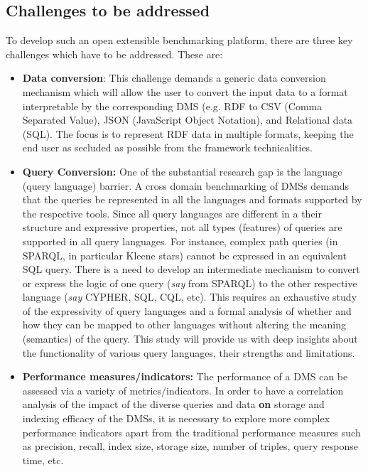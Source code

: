 \documentclass{llncs}
\begin{document}
    \subsection{Challenges to be addressed}\label{challenges}
        To develop such an open extensible benchmarking platform, there are three key challenges which have to be addressed. These are:
        \begin{itemize}[nosep]
            \item {} \textbf{Data conversion}: This challenge demands a generic data conversion mechanism which will allow the user to convert the input data to a format interpretable by the corresponding DMS (e.g. RDF to CSV (Comma Separated Value), JSON (JavaScript Object Notation),  and Relational data (SQL). The focus is to represent RDF data in multiple formats, keeping the end user as secluded as possible from the framework technicalities. 
            \item {} \textbf{Query Conversion:} 
            One of the substantial research gap is the language (query language) barrier. A cross domain benchmarking of DMSs demands that the queries be represented in all the languages and formats supported by the respective tools. Since all query languages are different in a their structure and expressive properties, not all types (features) of queries are supported in all query languages. For instance, complex path queries (in SPARQL, in particular Kleene stars) cannot be expressed in an equivalent SQL query. There is a need to develop an intermediate mechanism to convert or express the logic of one query (\textit{say} from SPARQL) to the other respective language (\textit{say} CYPHER, SQL, CQL, etc). This requires an exhaustive study of the expressivity of query languages and a formal analysis of whether and how they can be mapped to other languages without altering the meaning (semantics) of the query. This study will provide us with deep insights about the functionality of various query languages, their strengths and limitations.
            \item {} \textbf{Performance measures/indicators:} 
            The performance of a DMS can be assessed via a variety of metrics/indicators. In order to have a correlation analysis of the impact of the diverse queries and data \textbf{on} storage and indexing efficacy of the DMSs, it is necessary to explore more complex performance indicators apart from the traditional performance measures such as precision, recall, index size, storage size, number of triples, query response time, etc.
        \end{itemize}
    
\end{document}
